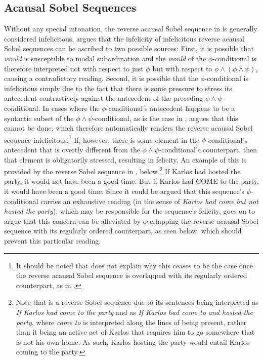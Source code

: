 \subsection{Acausal Sobel Sequences}
Without any special intonation, the reverse acausal Sobel sequence in  is generally considered infelicitous. \textcite[p. 151f]{Klecha2014} argues that the infelicity of infelicitous reverse acausal Sobel sequences can be ascribed to two possible sources: First, it is possible that \textit{would} is susceptible to modal subordination and the \textit{would} of the $\phi$-conditional is therefore interpreted not with respect to just $\phi$ but with respect to $\phi\land(\phi\land\psi)$, causing a contradictory reading. Second, it is possible that the $\phi$-conditional is infelicitous simply due to the fact that there is some pressure to stress its antecedent contrastively against the antecedent of the preceding $\phi\land\psi$-conditional. In cases where the $\phi$-conditional's antecedent happens to be a syntactic subset of the $\phi\land\psi$-conditional, as is the case in , \textcite{Klecha2014,Klecha2015} argues that this cannot be done, which therefore automatically renders the reverse acausal Sobel sequence infelicitous.\footnote{It should be noted that \parencite{Klecha2014,Klecha2015} does not explain why this ceases to be the case once the reverse acausal Sobel sequence is overlapped with its regularly ordered counterpart, as in .} If, however, there is some element in the $\phi$-conditional's antecedent that is overtly different from the $\phi\land\psi$-conditional's counterpart, then that element is obligatorily stressed, resulting in felicity. An example of this is provided by the reverse Sobel sequence in , below.\footnote{Note that  is a reverse Sobel sequence due to its sentences being interpreted as \textit{If Karlos had come to the party} and as \textit{If Karlos had come to and hosted the party}, where \textit{come to} is interpreted along the lines of being present, rather than it being an active act of Karlos that requires him to go somewhere that is not his own home. As such, Karlos hosting the party would entail Karlos coming to the party.}
\pex\label{ex:contrast-host}
\a{}If Karlos had hosted the party, it would not have been a
good time.
\a{}But if Karlos had \MakeUppercase{come} to the party, it would have
been a good time.\hfill\parencite[p.~151]{Klecha2014}
\xe
Since it could be argued that this sequence's $\phi$-conditional carries an exhaustive reading (in the sense of \textit{Karlos had come but not hosted the party}), which may be responsible for the sequence's felicity, \textcite{Klecha2014} goes on to argue that this concern can be alleviated by overlapping the reverse acausal Sobel sequence with its regularly ordered counterpart, as seen below, which should prevent this particular reading. 
